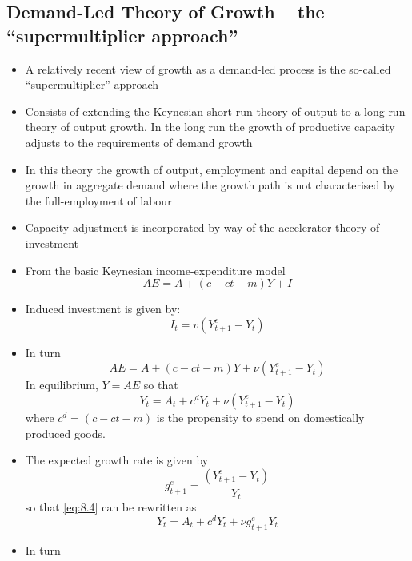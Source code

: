 \documentclass{article}
\begin{document}
\subsection{Demand-Led Theory of Growth -- the ``supermultiplier approach''}
\begin{itemize}
	\item A relatively recent view of growth as a demand-led process is the so-called ``supermultiplier'' approach
	\item Consists of extending the Keynesian short-run theory of output to a long-run theory of output growth. In the long run the growth of productive capacity adjusts to the requirements of demand growth
	\item In this theory the growth of output, employment and capital depend on the growth in aggregate demand where the growth path is not characterised by the full-employment of labour 
	\item Capacity adjustment is incorporated by way of the accelerator theory of investment
	\item From the basic Keynesian income-expenditure model
	\begin{equation}
		AE = A + (c - ct - m) Y + I \label{eq:8.1}
	\end{equation}
	\item Induced investment is given by:
	\begin{equation}
		I_t = v (Y_{t+1}^e - Y_t) \label{eq:8.2}
	\end{equation}
	\item In turn
	\begin{equation}
		AE = A + (c - ct - m) Y + \nu (Y_{t+1}^e - Y_t) \label{eq:8.3}
	\end{equation}
	In equilibrium, \( Y = AE \) so that
	\begin{equation}
		Y_t = A_t + c^d Y_t + \nu (Y_{t+1}^e - Y_t) \label{eq:8.4}
	\end{equation}
	where \( c^d = (c - ct - m) \) is the propensity to spend on domestically produced goods.
	\item The expected growth rate is given by
	\begin{equation}
		g_{t+1}^e = \frac{\left( Y_{t+1}^e - Y_t \right)}{Y_t} \label{eq:8.5}
	\end{equation}
	so that \cref{eq:8.4} can be rewritten as
	\begin{equation}
		Y_t = A_t + c^d Y_t + \nu g_{t+1}^e Y_t \label{eq:8.6}
	\end{equation}
	\item In turn

\end{itemize}
\end{document}
